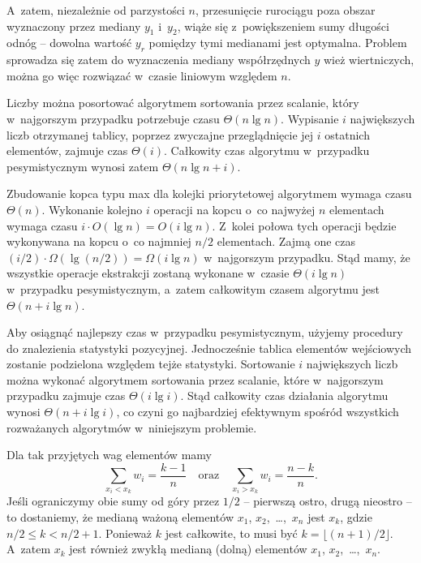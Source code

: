 A~zatem, niezależnie od parzystości $n$, przesunięcie rurociągu poza obszar wyznaczony przez mediany $y_1$ i~$y_2$, wiąże się z~powiększeniem sumy długości odnóg -- dowolna wartość $y_r$ pomiędzy tymi medianami jest optymalna. Problem sprowadza się zatem do wyznaczenia mediany współrzędnych $y$ wież wiertniczych, można go więc rozwiązać w~czasie liniowym względem $n$.

\problems


\subproblem %
Liczby można posortować algorytmem sortowania przez scalanie, który w~najgorszym przypadku potrzebuje czasu $\Theta(n\lg n)$. Wypisanie $i$ największych liczb otrzymanej tablicy, poprzez zwyczajne przeglądnięcie jej $i$ ostatnich elementów, zajmuje czas $\Theta(i)$. Całkowity czas algorytmu w~przypadku pesymistycznym wynosi zatem $\Theta(n\lg n+i)$.

\subproblem %
Zbudowanie kopca typu max dla kolejki priorytetowej algorytmem  wymaga czasu $\Theta(n)$. Wykonanie kolejno $i$ operacji  na kopcu o~co najwyżej $n$ elementach wymaga czasu $i\cdot O(\lg n)=O(i\lg n)$. Z~kolei połowa tych operacji będzie wykonywana na kopcu o~co najmniej $n/2$ elementach. Zajmą one czas $(i/2)\cdot\Omega(\lg(n/2))=\Omega(i\lg n)$ w~najgorszym przypadku. Stąd mamy, że wszystkie operacje ekstrakcji zostaną wykonane w~czasie $\Theta(i\lg n)$ w~przypadku pesymistycznym, a~zatem całkowitym czasem algorytmu jest $\Theta(n+i\lg n)$.

\subproblem %
Aby osiągnąć najlepszy czas w~przypadku pesymistycznym, użyjemy procedury  do znalezienia  statystyki pozycyjnej. Jednocześnie tablica elementów wejściowych zostanie podzielona względem tejże statystyki. Sortowanie $i$ największych liczb można wykonać algorytmem sortowania przez scalanie, które w~najgorszym przypadku zajmuje czas $\Theta(i\lg i)$. Stąd całkowity czas działania algorytmu wynosi $\Theta(n+i\lg i)$, co czyni go najbardziej efektywnym spośród wszystkich rozważanych algorytmów w~niniejszym problemie.


\subproblem %
Dla tak przyjętych wag elementów mamy
\[
	\sum_{x_i<x_k}w_i = \frac{k-1}{n} \quad\text{oraz}\quad \sum_{x_i>x_k}w_i = \frac{n-k}{n}.
\]
Jeśli ograniczymy obie sumy od góry przez $1/2$ -- pierwszą ostro, drugą nieostro -- to dostaniemy, że medianą ważoną elementów $x_1$, $x_2$,~\dots,~$x_n$ jest $x_k$, gdzie $n/2\le k<n/2+1$. Ponieważ $k$ jest całkowite, to musi być $k=\lfloor(n+1)/2\rfloor$. A~zatem $x_k$ jest również zwykłą medianą (dolną) elementów $x_1$, $x_2$,~\dots,~$x_n$.

